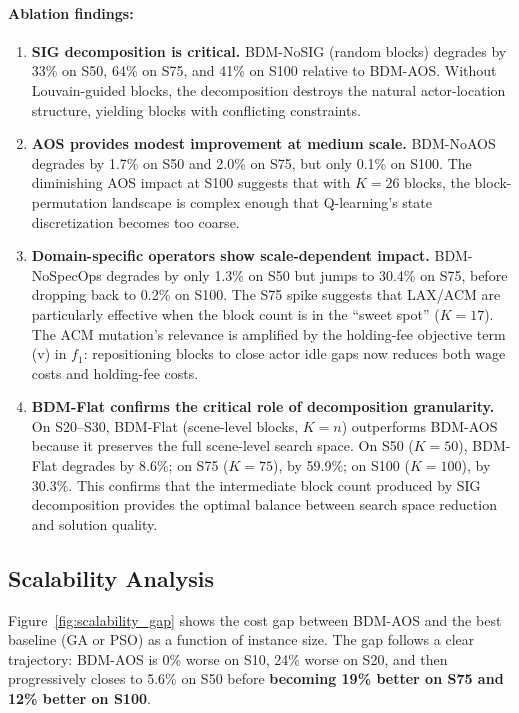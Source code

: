 \paragraph{Ablation findings:}
\begin{enumerate}
    \item \textbf{SIG decomposition is critical.}
    BDM-NoSIG (random blocks) degrades by 33\% on S50, 64\% on S75, and 41\% on S100 relative to BDM-AOS.
    Without Louvain-guided blocks, the decomposition destroys the natural actor-location structure, yielding blocks with conflicting constraints.

    \item \textbf{AOS provides modest improvement at medium scale.}
    BDM-NoAOS degrades by 1.7\% on S50 and 2.0\% on S75, but only 0.1\% on S100.
    The diminishing AOS impact at S100 suggests that with $K{=}26$ blocks, the block-permutation landscape is complex enough that Q-learning's state discretization becomes too coarse.

    \item \textbf{Domain-specific operators show scale-dependent impact.}
    BDM-NoSpecOps degrades by only 1.3\% on S50 but jumps to 30.4\% on S75, before dropping back to 0.2\% on S100.
    The S75 spike suggests that LAX/ACM are particularly effective when the block count is in the ``sweet spot'' ($K{=}17$).
    The ACM mutation's relevance is amplified by the holding-fee objective term (v) in $f_1$: repositioning blocks to close actor idle gaps now reduces both wage costs and holding-fee costs.

    \item \textbf{BDM-Flat confirms the critical role of decomposition granularity.}
    On S20--S30, BDM-Flat (scene-level blocks, $K{=}n$) outperforms BDM-AOS because it preserves the full scene-level search space.
    On S50 ($K{=}50$), BDM-Flat degrades by 8.6\%; on S75 ($K{=}75$), by 59.9\%; on S100 ($K{=}100$), by 30.3\%.
    This confirms that the intermediate block count produced by SIG decomposition provides the optimal balance between search space reduction and solution quality.
\end{enumerate}

\subsection{Scalability Analysis}
\label{sec:scalability}

Figure~\ref{fig:scalability_gap} shows the cost gap between BDM-AOS and the best baseline (GA or PSO) as a function of instance size.
The gap follows a clear trajectory: BDM-AOS is 0\% worse on S10, 24\% worse on S20, and then progressively closes to 5.6\% on S50 before \textbf{becoming 19\% better on S75 and 12\% better on S100}.

